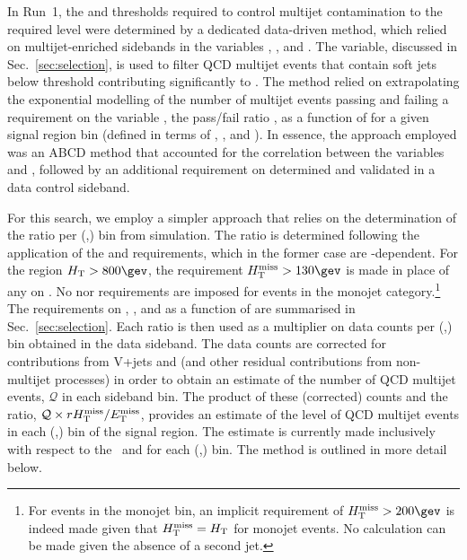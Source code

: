 In Run~1, the \alphat and \bdphi thresholds required to control
multijet contamination to the required level were determined by a
dedicated data-driven method, which relied on multijet-enriched
sidebands in the variables \alphat, \bdphi, and \mhtmet. The \mhtmet
variable, discussed in Sec.~\ref{sec:selection}, is used to filter QCD
multijet events that contain soft jets below threshold contributing
significantly to \mht. The method relied on extrapolating the
exponential modelling of the number of multijet events passing and
failing a requirement on the variable \mhtmet, \ie the pass/fail ratio
\rmhtmet, as a function of \alphat for a given signal region bin
(defined in terms of \njet, \nb, and \scalht). In essence, the
approach employed was an ABCD method that accounted for the
correlation between the variables \rmhtmet and \alphat, followed
by an additional requirement on \bdphi determined and validated in a
data control sideband.

For this search, we employ a simpler approach that relies on the
determination of the ratio \rmhtmet per (\njet,\scalht) bin from
simulation. The ratio is determined following the application of the
\alphat and \bdphi requirements, which in the former case are
\scalht-dependent. For the region $\scalht > 800\gev$, the requirement
$\mht > 130\gev$ is made in place of any on \alphat. No \alphat nor
\mht requirements are imposed for events in the monojet
category.\footnote{For events in the monojet bin, an implicit
  requirement of $\mht > 200\gev$ is indeed made given that $\mbox{$H_{\rm T}^{\rm miss}$} =
  \mbox{$H_\text{T}$}$ for monojet events. No \alphat calculation can be made
  given the absence of a second jet.} The requirements on \alphat,
\mht, and \bdphi as a function of \scalht are summarised in
Sec.~\ref{sec:selection}. Each ratio \rmhtmet is then used as a
multiplier on data counts per (\njet,\scalht) bin obtained in the
\mhtmet data sideband. The data counts are corrected for contributions
from V+jets and \ttbar (and other residual contributions from
non-multijet processes) in order to obtain an estimate of the number
of QCD multijet events, $\mathcal{Q}$ in each sideband bin. The
product of these (corrected) counts and the ratio, $\mathcal{Q} \times
r\mbox{$\mbox{$H_{\rm T}^{\rm miss}$} / \mbox{$E_\text{T}^{\rm miss}$}$}$, provides an estimate of the level of QCD multijet events in
each (\njet,\scalht) bin of the signal region. The estimate is
currently made inclusively with respect to the \nb\ and \mht for each
(\njet,\scalht) bin. The method is outlined in more detail below.

